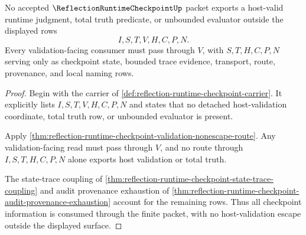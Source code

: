 \begin{theorem}
\label{thm:reflection-runtime-checkpoint-host-validation-nonescape}
No accepted $\ReflectionRuntimeCheckpointUp$ packet exports a host-valid runtime judgment, total truth predicate, or unbounded evaluator outside the displayed rows
$$
I,S,T,V,H,C,P,N.
$$
Every validation-facing consumer must pass through $V$, with $S,T,H,C,P,N$ serving only as checkpoint state, bounded trace evidence, transport, route, provenance, and local naming rows.
\end{theorem}
\begin{proof}
Begin with the carrier of \autoref{def:reflection-runtime-checkpoint-carrier}. It explicitly lists $I,S,T,V,H,C,P,N$ and states that no detached host-validation coordinate, total truth row, or unbounded evaluator is present.

Apply \autoref{thm:reflection-runtime-checkpoint-validation-nonescape-route}. Any validation-facing read must pass through $V$, and no route through $I,S,T,H,C,P,N$ alone exports host validation or total truth.

The state-trace coupling of \autoref{thm:reflection-runtime-checkpoint-state-trace-coupling} and audit provenance exhaustion of \autoref{thm:reflection-runtime-checkpoint-audit-provenance-exhaustion} account for the remaining rows. Thus all checkpoint information is consumed through the finite packet, with no host-validation escape outside the displayed surface.
\end{proof}


